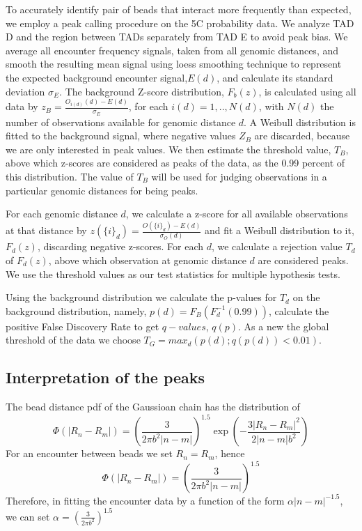 \documentclass[12pt]{book}
\begin{document}
To accurately identify pair of beads that interact more frequently than expected, we employ a peak calling procedure on the 5C probability data. We analyze TAD D and the region between TADs separately from TAD E to avoid peak bias. We average all encounter frequency signals, taken from all genomic distances, and smooth the resulting mean signal using loess smoothing technique to represent the expected background encounter signal,$E(d)$, and calculate its standard deviation $\sigma_E$. The background Z-score distribution, $F_b(z)$, is calculated using all data by $z_B=\frac{O_{i(d)}(d)-E(d)}{\sigma_E}$, for each $i(d)=1,..,N(d)$, with $N(d)$ the number of observations available for genomic distance $d$. A Weibull distribution is fitted to the background signal, where negative values $Z_B$ are discarded, because we are only interested in peak values. We then estimate the threshold value, $T_B$, above which z-scores are considered as peaks of the data, as the 0.99 percent of this distribution. The value of $T_B$ will be used for judging observations in a particular genomic distances for being peaks.

For each genomic distance $d$, we calculate a z-score for all available observations at that distance by $z({\{i\}_d})=\frac{O({\{i\}_d})-E(d)}{\sigma_{O}(d)}$ and fit a Weibull distribution to it, $F_d(z)$, discarding negative z-scores. For each $d$, we calculate a rejection value $T_d$ of $F_d(z)$, above which observation at genomic distance $d$ are considered peaks. We use the threshold values as our test statistics for multiple hypothesis tests.

Using the background distribution we calculate the p-values for $T_d$ on the background distribution, namely, $p(d)=F_B(F_d^{-1}(0.99))$, calculate the positive False Discovery Rate\cite{storey2002direct} to get $q-values$, $q(p)$. As a new the global threshold of the data we choose $T_G = max_d (p(d); q(p(d))<0.01)$.

\subsection{Interpretation of the peaks}\label{subsection_interpretationOfThePeaks}
The bead distance pdf of the Gaussioan chain has the distribution of 
\begin{equation*}
\Phi(|R_n-R_m|)=\left(\frac{3}{2\pi b^2 |n-m|}\right)^{1.5}\exp(-\frac{3|R_n-R_m|^2}{2|n-m|b^2})
\end{equation*} 
For an encounter between beads we set $R_n=R_m$, hence 
\begin{equation*}
\Phi(|R_n-R_m|)=\left(\frac{3}{2\pi b^2 |n-m|}\right)^{1.5}
\end{equation*}
Therefore, in fitting the encounter data by a function of the  form $\alpha |n-m|^{-1.5}$, we can set $\alpha = \left(\frac{3}{2\pi b^2}\right)^{1.5}$ 
\end{document}
